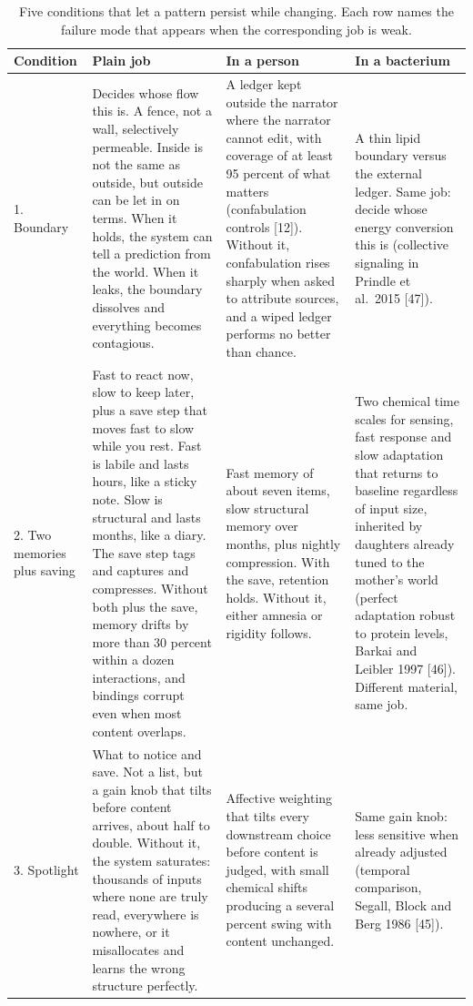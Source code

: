 \documentclass[11pt,a4paper]{article}
\begin{document}
\begin{table}[h]
\centering
\small
\renewcommand{\arraystretch}{1.25}
\caption{Five conditions that let a pattern persist while changing. Each row names the failure mode that appears when the corresponding job is weak.}
\begin{tabular}{p{1.4cm}p{3.5cm}p{3.5cm}p{3.5cm}}
\toprule
Condition & Plain job & In a person & In a bacterium \\
\midrule
1. Boundary & Decides whose flow this is. A fence, not a wall, selectively permeable. Inside is not the same as outside, but outside can be let in on terms. When it holds, the system can tell a prediction from the world. When it leaks, the boundary dissolves and everything becomes contagious. & A ledger kept outside the narrator where the narrator cannot edit, with coverage of at least 95 percent of what matters (confabulation controls [12]). Without it, confabulation rises sharply when asked to attribute sources, and a wiped ledger performs no better than chance. & A thin lipid boundary versus the external ledger. Same job: decide whose energy conversion this is (collective signaling in Prindle et al.\ 2015 [47]). \\
2. Two memories plus saving & Fast to react now, slow to keep later, plus a save step that moves fast to slow while you rest. Fast is labile and lasts hours, like a sticky note. Slow is structural and lasts months, like a diary. The save step tags and captures and compresses. Without both plus the save, memory drifts by more than 30 percent within a dozen interactions, and bindings corrupt even when most content overlaps. & Fast memory of about seven items, slow structural memory over months, plus nightly compression. With the save, retention holds. Without it, either amnesia or rigidity follows. & Two chemical time scales for sensing, fast response and slow adaptation that returns to baseline regardless of input size, inherited by daughters already tuned to the mother's world (perfect adaptation robust to protein levels, Barkai and Leibler 1997 [46]). Different material, same job. \\
3. Spotlight & What to notice and save. Not a list, but a gain knob that tilts before content arrives, about half to double. Without it, the system saturates: thousands of inputs where none are truly read, everywhere is nowhere, or it misallocates and learns the wrong structure perfectly. & Affective weighting that tilts every downstream choice before content is judged, with small chemical shifts producing a several percent swing with content unchanged. & Same gain knob: less sensitive when already adjusted (temporal comparison, Segall, Block and Berg 1986 [45]). \\

\end{tabular}
\end{table}
\end{document}
